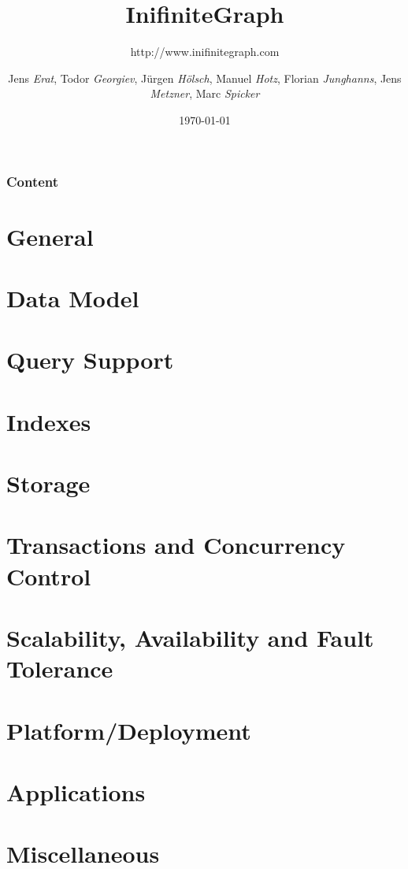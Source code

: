 \documentclass{beamer}
\title[InifiniteGraph]{\textsf{InifiniteGraph}}
\subtitle{http://www.inifinitegraph.com}
\author[JE,TG,JH,MH,FJ,JM,MS]{Jens \textit{Erat},
Todor \textit{Georgiev},
J\"{u}rgen \textit{H\"{o}lsch},
Manuel \textit{Hotz},
Florian \textit{Junghanns},
Jens \textit{Metzner},
Marc \textit{Spicker}}
\institute[]{Universität Konstanz}
\date{\today}
\begin{document}

\begin{frame}
\titlepage
\end{frame} 


\begin{frame}
\frametitle{Content}
\tableofcontents
\end{frame} 


\section{General}


\section{Data Model}


\section{Query Support}


\section{Indexes}


\section{Storage}


\section{Transactions and Concurrency Control}


\section{Scalability, Availability and Fault Tolerance}


\section{Platform/Deployment}


\section{Applications}


\section{Miscellaneous}

\end{document}
